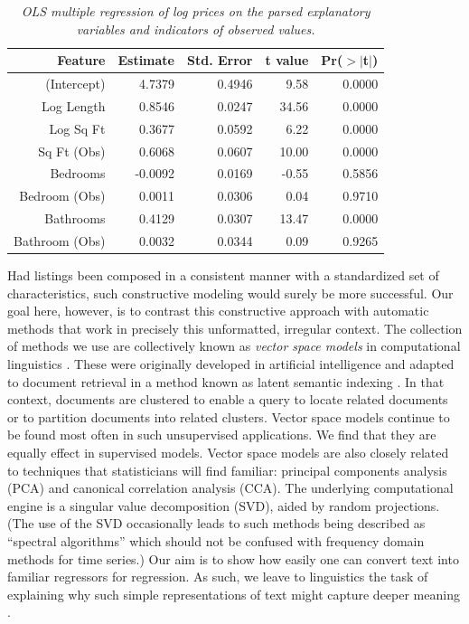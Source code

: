 \documentclass[10pt]{article}
\begin{document}
 
 \begin{table}[ht]
\caption{ \label{tab:parsed} {\sl OLS multiple regression of log prices on the
 parsed explanatory variables and  indicators of observed values.}}
\centering
\begin{tabular}{rrrrr}
  \hline
    Feature        & Estimate & Std. Error & t value & Pr($>$$|$t$|$) \\ 
  \hline
(Intercept)           & 4.7379 & 0.4946 & 9.58 & 0.0000 \\ 
  Log Length       & 0.8546 & 0.0247 & 34.56 & 0.0000 \\ 
  Log Sq Ft          & 0.3677 & 0.0592 & 6.22 & 0.0000 \\ 
  Sq Ft (Obs)       & 0.6068 & 0.0607 & 10.00 & 0.0000 \\ 
  Bedrooms         & -0.0092 & 0.0169 & -0.55 & 0.5856 \\ 
  Bedroom (Obs) & 0.0011 & 0.0306 & 0.04 & 0.9710 \\ 
  Bathrooms        & 0.4129 & 0.0307 & 13.47 & 0.0000 \\ 
  Bathroom (Obs) & 0.0032 & 0.0344 & 0.09 & 0.9265 \\ 
   \hline
\end{tabular}
\end{table}

 
 
 Had listings been composed in a consistent manner with a standardized set of
 characteristics, such constructive modeling would surely be more successful.
  Our goal here, however, is to contrast this constructive approach with
 automatic methods that work in precisely this unformatted, irregular context.
  The collection of methods we use are collectively known as {\em vector space
 models} in computational linguistics \citep[e.g.][]{turney10}.  These were
 originally developed in artificial intelligence and adapted to document
 retrieval in a method known as latent semantic indexing \citep{deerwester88}.
  In that context, documents are clustered to enable a query to locate related
 documents or to partition documents into related clusters. Vector space models
 continue to be found most often in such unsupervised applications.  We find
 that they are equally effect in supervised models.  Vector space models are
 also closely related to techniques that statisticians will find familiar:
 principal components analysis (PCA) and canonical correlation analysis (CCA).
  The underlying computational engine is a singular value decomposition (SVD),
 aided by random projections.  (The use of the SVD occasionally leads to such
 methods being described as ``spectral algorithms'' which should not be confused
 with frequency domain methods for time series.)  Our aim is to show how easily
 one can convert text into familiar regressors for regression.  As such, we
 leave to linguistics the task of explaining why such simple representations of
 text might capture deeper meaning \citep{deerwester90, landauer97,
 bullinaria07, turney10}.
\end{document}
